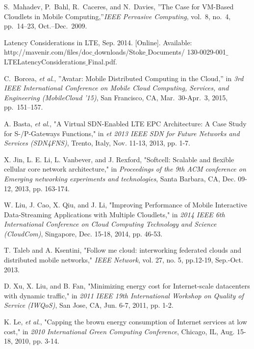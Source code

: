 \documentclass[journal,12pt,draftclsnofoot,onecolumn]{IEEEtran}
\begin{document}


\begin{thebibliography}{15}

S.~Mahadev, P.~Bahl, R.~Caceres, and N.~Davies, ''{The Case for VM-Based Cloudlets in Mobile Computing},''\emph{IEEE Pervasive Computing}, vol.~8, no.~4, pp.~14--23, Oct.--Dec.~2009.

Latency Considerations in LTE, Sep. 2014. [Online]. Available: http://mavenir.com/files/doc$\_$downloads/Stoke$\_$Documents/ 130-0029-001$\_$LTELatencyConsiderations$\_$Final.pdf.

C.~Borcea, \emph{et al}., ''{Avatar: Mobile Distributed Computing in the Cloud},'' in \emph{3rd IEEE International Conference on Mobile Cloud Computing, Services, and Engineering (MobileCloud '15)}, San Francisco, CA, Mar.~30-Apr.~3, 2015, pp.~151--157.

A. Basta, \emph{et al}., "A Virtual SDN-Enabled LTE EPC Architecture: A Case Study for S-/P-Gateways Functions," in \emph{et 2013 IEEE SDN for Future Networks and Services (SDN4FNS)}, Trento, Italy, Nov. 11-13, 2013, pp. 1-7.

X. Jin, L. E. Li, L. Vanbever, and J. Rexford, "Softcell: Scalable and flexible cellular core network architecture," in \emph{Proceedings of the 9th ACM conference on Emerging networking experiments and technologies}, Santa Barbara, CA, Dec. 09-12, 2013, pp. 163-174.

W. Liu, J. Cao, X. Qiu, and J. Li, "Improving Performance of Mobile Interactive Data-Streaming Applications with Multiple Cloudlets," in \emph{ 2014 IEEE 6th International Conference on Cloud Computing Technology and Science (CloudCom)}, Singapore, Dec. 15-18, 2014, pp. 46-53.

T. Taleb and A. Ksentini, "Follow me cloud: interworking federated clouds and distributed mobile networks," \emph{IEEE Network}, vol. 27, no. 5, pp.12-19, Sep.-Oct. 2013.

D. Xu, X. Liu, and B. Fan, "Minimizing energy cost for Internet-scale datacenters with dynamic traffic," in \emph{2011 IEEE 19th International Workshop on Quality of Service (IWQoS)}, San Jose, CA, Jun. 6-7, 2011, pp. 1-2.

K. Le, \emph{et al}., "Capping the brown energy consumption of Internet services at low cost," in \emph{2010 International Green Computing Conference}, Chicago, IL, Aug. 15-18, 2010, pp. 3-14.


\end{thebibliography}
\end{document}
